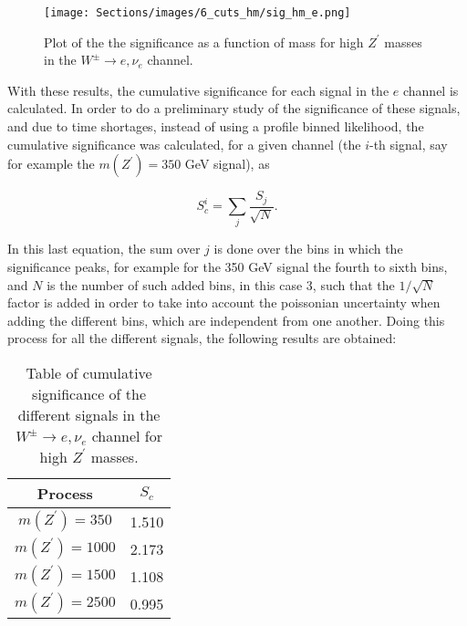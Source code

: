 \begin{figure}[ht!]
    \centering
    \texttt{[image: Sections/images/6\_cuts\_hm/sig\_hm\_e.png]}
    \caption{Plot of the the significance as a function of mass for high $Z^{\prime}$ masses in the $W^{\pm}\rightarrow e, \nu_e$ channel.}
    \label{Sig_e}
\end{figure}

With these results, the cumulative significance for each signal in the $e$ channel is calculated. In order to do a preliminary study of the significance of these signals, and due to time shortages, instead of using a profile binned likelihood, the cumulative significance was calculated, for a given channel (the $i$-th signal, say for example the $m(Z^{\prime}) = 350$ GeV signal), as

\begin{equation}
\label{eqcumulativesignificance}
    S_c^i = \sum_j \dfrac{S_j}{\sqrt{N}}.
\end{equation}

In this last equation, the sum over $j$ is done over the bins in which the significance peaks, for example for the 350 GeV signal the fourth to sixth bins, and $N$ is the number of such added bins, in this case 3, such that the $1/\sqrt{N}$ factor is added in order to take into account the poissonian uncertainty when adding the different bins, which are independent from one another. Doing this process for all the different signals, the following results are obtained:

\begin{table}[ht!]
\centering
\caption{Table of cumulative significance of the different signals in the $W^{\pm} \rightarrow e, \nu_e$ channel for high $Z^{\prime}$ masses.}
\label{Table_cumulative_sig_hm_e}
\begin{tabular}{c|c}
\hline
\hline
Process & $S_c$ \\
\hline
$m(Z^{\prime}) = 350$ & 1.510 \\
$m(Z^{\prime}) = 1000$ & 2.173 \\
$m(Z^{\prime}) = 1500$ & 1.108 \\
$m(Z^{\prime}) = 2500$ & 0.995 \\
\hline
\hline
\end{tabular}
\end{table}

